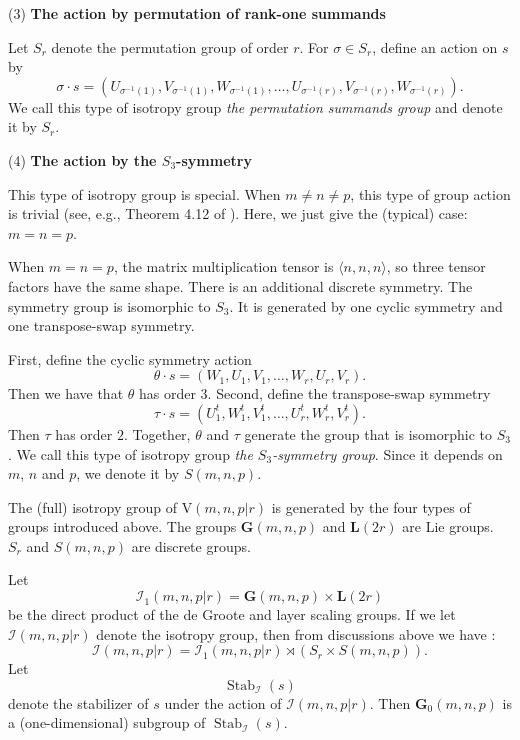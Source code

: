 \documentclass[reqno]{amsart}
\theoremstyle{definition}
\numberwithin{equation}{section}
\theoremstyle{remark}
\begin{document}
(3) \textbf{The action by permutation of rank-one summands}

Let $S_r$ denote the permutation group of order $r$. 
For $\sigma\in S_r$, define an action on $s$ by
\begin{equation*} 
\sigma\cdot s=  \left(U_{\sigma^{-1}(1)},V_{\sigma^{-1}(1)},W_{\sigma^{-1}(1)},\ldots,
U_{\sigma^{-1}(r)},V_{\sigma^{-1}(r)},W_{\sigma^{-1}(r)}\right).
\end{equation*}
We call this type of isotropy group \emph{the permutation summands group} and denote it by $S_r$.

(4) \textbf{The action by the $S_3$-symmetry}

This type of isotropy group is special. When $m\neq n\neq p$, this type of group action is trivial (see, e.g., Theorem 4.12 of \cite{Bur15}). Here, we just give the (typical) case: $m=n=p$.

When $m=n=p$, the matrix multiplication tensor is $\langle n,n,n\rangle $,
so three tensor factors have the same shape. There is an additional discrete symmetry. The symmetry group is isomorphic to $S_3$. It is generated by one cyclic symmetry and one transpose-swap symmetry.

First, define the cyclic symmetry action
$$
\theta\cdot s=(W_1,U_1,V_1,\ldots, W_r,U_r,V_r).
$$
Then we have that $\theta$ has order $3$.
Second, define the transpose-swap symmetry
$$\tau\cdot s=(U_1^{t},W_1^{t},V_1^{t},\ldots, U_r^{t},W_r^{t},V_r^{t}).
$$
Then $\tau$ has order $2$. Together, $\theta$ and $\tau$ generate the group that is isomorphic to  $S_3$. We call this type of isotropy group \emph{the $S_3$-symmetry group}. Since it depends on $m$, $n$ and $p$, we denote it by $S(m,n,p)$.

The (full) isotropy group of $\mathrm{V}(m,n,p|r)$ is generated by the four types of groups introduced above. The groups $\mathbf{G}(m,n,p)$ and
$\mathbf{L}(2r)$ are Lie groups. $S_r$ and $S(m,n,p)$ are discrete groups.


Let 
\begin{equation}\label{eq-Imnpr1}
\mathcal{I}_1(m,n,p|r)=\mathbf{G}(m,n,p)\times \mathbf{L}(2r)
\end{equation}
be the direct product of the de Groote and layer scaling groups. If we let $\mathcal{I}(m,n,p|r)$ denote the isotropy group, then from discussions above we have \cite{Bur15,deGr78-1}:
\begin{equation}\label{eq-Inmpr}
\mathcal{I}(m,n,p|r)=\mathcal{I}_1(m,n,p|r)\rtimes (S_r \times S(m,n,p)).
\end{equation}
Let 
$$\operatorname{Stab}_{\mathcal{I}}(s)$$
denote the stabilizer of $s$ under the action of
$\mathcal{I}(m,n,p|r)$. Then $\mathbf{G}_0(m,n,p)$ is a (one-dimensional) subgroup of $\operatorname{Stab}_{\mathcal{I}}(s)$.
\end{document}

